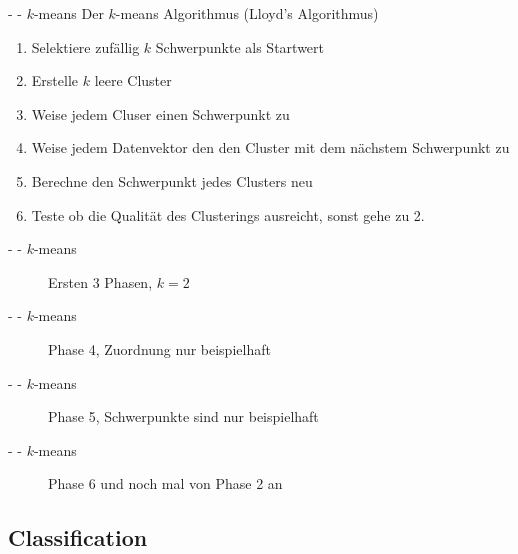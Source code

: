 \documentclass[fleqn,11pt,aspectratio=43]{beamer}
\begin{document}
\begin{frame}{\insertsectionhead - \insertsubsectionhead - $k$-means \cite{dwh}}
Der $k$-means Algorithmus (Lloyd's Algorithmus)
\begin{enumerate}[label=\bfseries\arabic*.]
\item Selektiere zufällig $k$ Schwerpunkte als Startwert
\item Erstelle $k$ leere Cluster
\item Weise jedem Cluser einen Schwerpunkt zu
\item Weise jedem Datenvektor den den Cluster mit dem nächstem Schwerpunkt zu
\item Berechne den Schwerpunkt jedes Clusters neu
\item Teste ob die Qualität des Clusterings ausreicht, sonst gehe zu 2.
\end{enumerate}
\end{frame}

\begin{frame}{\insertsectionhead - \insertsubsectionhead - $k$-means}
\begin{figure}
\scalebox{1.1}{}
\caption{Ersten 3 Phasen, $k = 2$}
\end{figure}
\end{frame}

\begin{frame}{\insertsectionhead - \insertsubsectionhead - $k$-means}
\begin{figure}
\scalebox{1.1}{}
\caption{Phase 4, Zuordnung nur beispielhaft}
\end{figure}
\end{frame}

\begin{frame}{\insertsectionhead - \insertsubsectionhead - $k$-means}
\begin{figure}
\scalebox{1.1}{}
\caption{Phase 5, Schwerpunkte sind nur beispielhaft}
\end{figure}
\end{frame}

\begin{frame}{\insertsectionhead - \insertsubsectionhead - $k$-means}
\begin{figure}
\scalebox{1.1}{}
\caption{Phase 6 und noch mal von Phase 2 an}
\end{figure}
\end{frame}

\subsection{Classification~}
\end{document}
